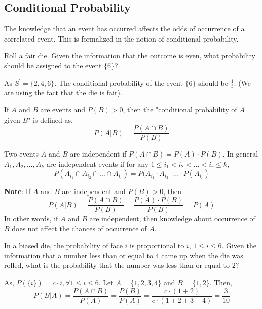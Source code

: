 \subsection{Conditional Probability}
The knowledge that an event has occurred affects the odds of occurrence of a
correlated event. This is formalized in the notion of conditional probability.

\begin{example}
    Roll a fair die. Given the information that the outcome is even, what
probability should be assigned to the event $\lbrace 6 \rbrace$?
\end{example}
\begin{solution}
    As $S^\prime = \lbrace 2, 4, 6 \rbrace$. The conditional probability of the
event $\lbrace 6 \rbrace$ should be $\frac{1}{3}$. (We are using the fact that
the die is fair).
\end{solution}

\begin{definition}
    If $A$ and $B$ are events and $P(B) > 0$, then the "conditional probability
of $A$ given $B$" is defined as, 
\begin{equation*}
    P(A \vert B) = \frac{P(A \cap B)}{P(B)}
\end{equation*}
\end{definition}

\begin{definition}
    Two events $A$ and $B$ are independent if $P(A \cap B) = P(A) \cdot P(B)$.
In general $A_1, A_2, \dots, A_k$ are independent events if for any $1 \leq
i_1 < i_2 < \dots < i_r \leq k$,
\begin{equation*}
    P(A_{i_1} \cap A_{i_2} \cap \dots \cap A_{i_r}) = 
    P(A_{i_1} \cdot A_{i_2} \cdot \dots \cdot P(A_{i_r})
\end{equation*}
\end{definition}

\noindent \textbf{Note}: If $A$ and $B$ are independent and $P(B) > 0$, then 
\begin{equation*}
    P(A \vert B) = \frac{P(A \cap B)}{P(B)}
                 = \frac{P(A) \cdot P(B)}{P(B)}
                 = P(A)
\end{equation*}
In other words, if $A$ and $B$ are independent, then knowledge about occurrence
of $B$ does not affect the chances of occurrence of $A$.

\begin{example}
    In a biased die, the probability of face $i$ is proportional to $i$, $1
\leq i \leq 6$. Given the information that a number less than or equal to $4$
came up when the die was rolled, what is the probability that the number was
less than or equal to $2$?
\end{example}
\begin{solution}
    As, $P(\lbrace i \rbrace) = c \cdot i, \forall 1 \leq i \leq 6$. Let $A =
\lbrace 1, 2, 3, 4 \rbrace$ and $B = \lbrace 1, 2 \rbrace$. Then, 
\begin{equation*}
    P(B \vert A) = \frac{P(A \cap B)}{P(A)}
                 = \frac{P(B)}{P(A)}
                 = \frac{c \cdot (1 + 2)}{c \cdot (1 + 2 + 3 + 4)}
                 = \frac{3}{10}
\end{equation*}
\end{solution}
